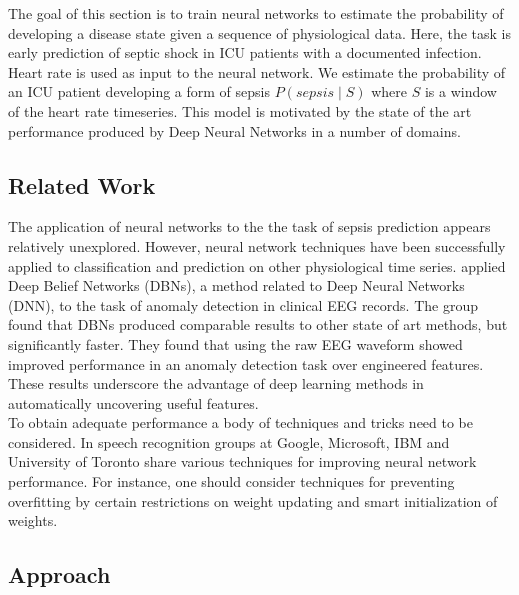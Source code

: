\documentclass[12pt,solutions]{article}
\begin{document}
The goal of this section is to train neural networks to estimate the probability of developing a disease state given a sequence of
physiological data. Here, the task is early prediction of septic shock in ICU patients with a documented infection. Heart rate is used as input to the neural network. We estimate the probability of an ICU patient developing a form of sepsis $P(sepsis \mid S)$ where $S$ is a window of the 
heart rate timeseries. This model is motivated by the state of the art performance produced by Deep Neural Networks in a number of domains.


\subsection{Related Work}

The application of neural networks to the the task of sepsis prediction appears relatively unexplored. However, neural network techniques have been successfully applied to classification and prediction on other physiological time series. \cite{wulsin2011modeling} applied Deep Belief Networks (DBNs), a method related to Deep Neural Networks (DNN), to the task of anomaly detection in clinical EEG records. The group found that 
DBNs produced comparable results to other state of art methods, but significantly faster. They found
that using the raw EEG waveform showed improved performance in an
anomaly detection task over engineered features.
These results underscore the advantage of deep learning methods in 
automatically uncovering useful features. \\

To obtain adequate performance a body of techniques and tricks need to be considered. In \cite{hinton2012deep} speech recognition groups at Google, Microsoft, IBM and University of Toronto share various techniques for improving neural network performance. For instance, one should consider techniques for
preventing overfitting by certain restrictions on weight updating and smart initialization of weights.

\subsection{Approach}
\end{document}
